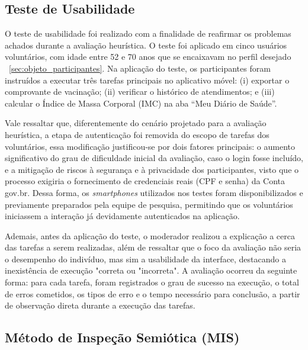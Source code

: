 \documentclass[12pt]{article}
\begin{document}
\begin{abstractp}
\subsection{Teste de Usabilidade} \label{sub:test_usa}
O teste de usabilidade foi realizado com a finalidade de reafirmar os problemas achados durante a avaliação heurística. O teste foi aplicado em cinco usuários voluntários, com idade entre 52 e 70 anos que se encaixavam no perfil desejado ~\ref{sec:objeto_participantes}. Na aplicação do teste, os participantes foram instruídos a executar três tarefas principais no aplicativo móvel: (i) exportar o comprovante de vacinação; (ii) verificar o histórico de atendimentos; e (iii) calcular o Índice de Massa Corporal (IMC) na aba ``Meu Diário de Saúde''.

Vale ressaltar que, diferentemente do cenário projetado para a avaliação heurística, a etapa de autenticação foi removida do escopo de tarefas dos voluntários, essa modificação justificou-se por dois fatores principais: o aumento significativo do grau de dificuldade inicial da avaliação, caso o login fosse incluído, e a mitigação de riscos à segurança e à privacidade dos participantes, visto que o processo exigiria o fornecimento de credenciais reais (CPF e senha) da Conta gov.br. Dessa forma, os \textit{smartphones} utilizados nos testes foram disponibilizados e previamente preparados pela equipe de pesquisa, permitindo que os voluntários iniciassem a interação já devidamente autenticados na aplicação.

Ademais, antes da aplicação do teste, o moderador realizou a explicação a cerca das tarefas a serem realizadas, além de ressaltar que o foco da avaliação não seria o desempenho do indivíduo, mas sim a usabilidade da interface, destacando a inexistência de execução "correta ou "incorreta". A avaliação ocorreu da seguinte forma: para cada tarefa, foram registrados o grau de sucesso na execução, o total de erros cometidos, os tipos de erro e o tempo necessário para conclusão, a partir de observação direta durante a execução das tarefas.

\subsection{Método de Inspeção Semiótica (MIS)} \label{sub_MIS}


\end{abstractp}
\end{document}

